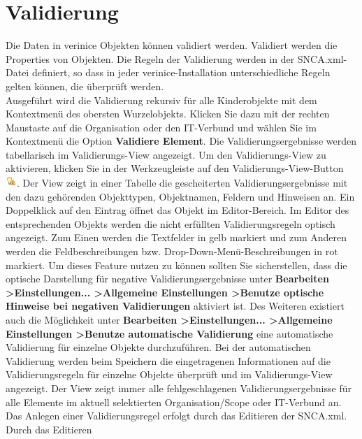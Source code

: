 \documentclass[a4paper,10pt]{book}
\begin{document}
\section{Validierung}
Die Daten in verinice Objekten können validiert werden. Validiert werden die Properties von Objekten.
Die Regeln der Validierung werden in der SNCA.xml-Datei definiert, so dass in jeder verinice-Installation unterschiedliche Regeln gelten können, die
überprüft werden.
\\
Ausgeführt wird die Validierung rekursiv für alle Kinderobjekte mit dem Kontextmenü des obersten Wurzelobjekts. Klicken Sie dazu mit der rechten
Maustaste auf die Organisation oder den IT-Verbund und wählen Sie im Kontextmenü die Option \textbf{Validiere Element}.
Die Validierungsergebnisse werden tabellarisch im Validierungs-View angezeigt. Um den Validierungs-View zu aktivieren, klicken Sie
in der Werkzeugleiste auf den Validierungs-View-Button \includegraphics[height=2ex]{Icon/quickfix_warning_obj.png}. Der View zeigt in einer Tabelle
die gescheiterten Validierungsergebnisse mit den dazu gehörenden Objekttypen, Objektnamen, Feldern und Hinweisen an. Ein Doppelklick auf den Eintrag
öffnet das Objekt im Editor-Bereich. Im Editor des entsprechenden Objekts werden die nicht erfüllten Validierungsregeln optisch angezeigt.
Zum Einen werden die Textfelder in gelb markiert und zum Anderen werden die Feldbeschreibungen bzw. Drop-Down-Menü-Beschreibungen in rot markiert.
Um dieses Feature nutzen zu können sollten Sie sicherstellen, dass die optische Darstellung für negative Validierungsergebnisse
unter \textbf{Bearbeiten \textgreater Einstellungen... \textgreater Allgemeine Einstellungen \textgreater Benutze optische
Hinweise bei negativen Validierungen} aktiviert ist. Des Weiteren existiert auch die Möglichkeit unter \textbf{Bearbeiten
\textgreater Einstellungen... \textgreater Allgemeine Einstellungen \textgreater Benutze automatische Validierung} eine automatische
Validierung für einzelne Objekte durchzuführen. Bei der automatischen Validierung werden beim Speichern die eingetragenen Informationen
auf die Validierungsregeln für einzelne Objekte überprüft und im Validierungs-View angezeigt. Der View zeigt immer alle fehlgeschlagenen
Validierungsergebnisse für alle Elemente im aktuell selektierten Organisation/Scope oder IT-Verbund an.
\newline\\
Das Anlegen einer Validierungsregel erfolgt durch das Editieren der SNCA.xml. Durch das Editieren
\end{document}
